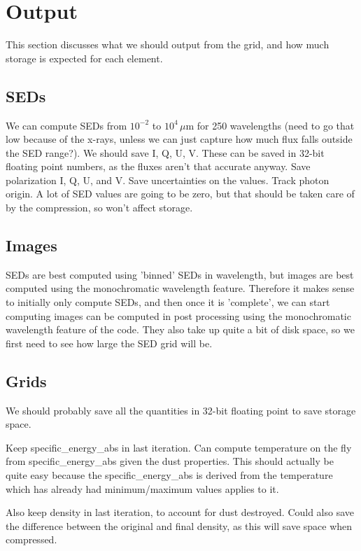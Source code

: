 \documentclass[10pt]{article}
\begin{document}
\section{Output}

This section discusses what we should output from the grid, and how much storage is expected for each element.

\subsection{SEDs}

We can compute SEDs from $10^{-2}$ to $10^4$\,$\mu$m for 250 wavelengths (need to go that low because of the x-rays, unless we can just capture how much flux falls outside the SED range?). We should save I, Q, U, V. These can be saved in 32-bit floating point numbers, as the fluxes aren't that accurate anyway. Save polarization I, Q, U, and V. Save uncertainties on the values. Track photon origin. A lot of SED values are going to be zero, but that should be taken care of by the compression, so won't affect storage.

\subsection{Images}

SEDs are best computed using 'binned' SEDs in wavelength, but images are best computed using the monochromatic wavelength feature. Therefore it makes sense to initially only compute SEDs, and then once it is 'complete', we can start computing images can be computed in post processing using the monochromatic wavelength feature of the code. They also take up quite a bit of disk space, so we first need to see how large the SED grid will be.

\subsection{Grids}

We should probably save all the quantities in 32-bit floating point to save storage space.

Keep specific\_energy\_abs in last iteration. Can compute temperature on the fly from specific\_energy\_abs given the dust properties. This should actually be quite easy because the specific\_energy\_abs is derived from the temperature which has already had minimum/maximum values applies to it.

Also keep density in last iteration, to account for dust destroyed. Could also save the difference between the original and final density, as this will save space when compressed.
\end{document}
